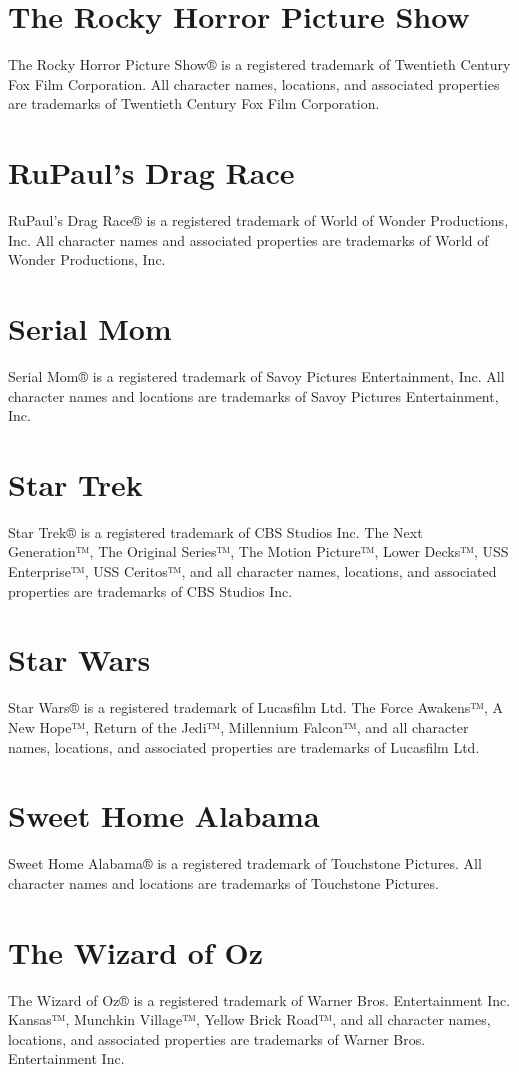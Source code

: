 \documentclass[11pt,letterpaper,oldstylefigures]{memoir}
\begin{document}
\section{The Rocky Horror Picture Show}
The Rocky Horror Picture Show® is a registered trademark of Twentieth Century Fox Film Corporation. All character names, locations, and associated properties are trademarks of Twentieth Century Fox Film Corporation.

\section{RuPaul's Drag Race}
RuPaul's Drag Race® is a registered trademark of World of Wonder Productions, Inc. All character names and associated properties are trademarks of World of Wonder Productions, Inc.

\section{Serial Mom}
Serial Mom® is a registered trademark of Savoy Pictures Entertainment, Inc. All character names and locations are trademarks of Savoy Pictures Entertainment, Inc.

\section{Star Trek}
Star Trek® is a registered trademark of CBS Studios Inc. The Next Generation™, The Original Series™, The Motion Picture™, Lower Decks™, USS Enterprise™, USS Ceritos™, and all character names, locations, and associated properties are trademarks of CBS Studios Inc.

\section{Star Wars}
Star Wars® is a registered trademark of Lucasfilm Ltd. The Force Awakens™, A New Hope™, Return of the Jedi™, Millennium Falcon™, and all character names, locations, and associated properties are trademarks of Lucasfilm Ltd.

\section{Sweet Home Alabama}
Sweet Home Alabama® is a registered trademark of Touchstone Pictures. All character names and locations are trademarks of Touchstone Pictures.

\section{The Wizard of Oz}
The Wizard of Oz® is a registered trademark of Warner Bros. Entertainment Inc. Kansas™, Munchkin Village™, Yellow Brick Road™, and all character names, locations, and associated properties are trademarks of Warner Bros. Entertainment Inc.
\end{document}

